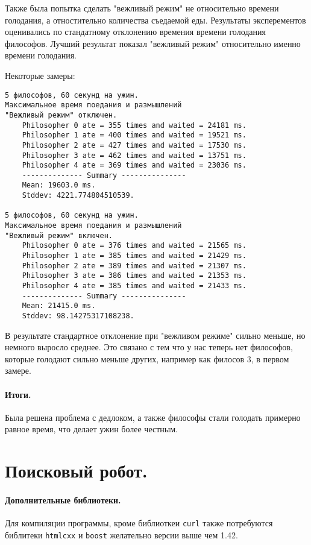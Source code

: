 \documentclass[12pt]{article}
\begin{document}
Также была попытка сделать "вежливый режим" не относительно времени голодания, а
отностительно количества съедаемой еды. Результаты эксперементов оценивались
по стандатному отклонению времения времени голодания философов.
Лучший результат показал "вежливый режим" относительно именно времени голодания.

Некоторые замеры:
\begin{verbatim}
5 философов, 60 секунд на ужин.
Максимальное время поедания и размышлений
"Вежливый режим" отключен.
    Philosopher 0 ate = 355 times and waited = 24181 ms.
    Philosopher 1 ate = 400 times and waited = 19521 ms.
    Philosopher 2 ate = 427 times and waited = 17530 ms.
    Philosopher 3 ate = 462 times and waited = 13751 ms.
    Philosopher 4 ate = 369 times and waited = 23036 ms.
    -------------- Summary ---------------
    Mean: 19603.0 ms.
    Stddev: 4221.774804510539.

5 философов, 60 секунд на ужин.
Максимальное время поедания и размышлений
"Вежливый режим" включен.
    Philosopher 0 ate = 376 times and waited = 21565 ms.
    Philosopher 1 ate = 385 times and waited = 21429 ms.
    Philosopher 2 ate = 389 times and waited = 21307 ms.
    Philosopher 3 ate = 386 times and waited = 21353 ms.
    Philosopher 4 ate = 385 times and waited = 21433 ms.
    -------------- Summary ---------------
    Mean: 21415.0 ms.
    Stddev: 98.14275317108238.
\end{verbatim}

В результате стандартное отклонение при "вежливом режиме" сильно
меньше, но немного выросло среднее. Это связано с тем
что у нас теперь нет философов, которые голодают сильно меньше
других, например как филосов 3, в первом замере.

\paragraph{Итоги.} Была решена проблема с дедлоком, а также философы стали
голодать примерно равное время, что делает ужин более честным.



\section{Поисковый робот.}
\paragraph{Дополнительные библиотеки.}
Для компиляции программы, кроме библиоткеи \verb|curl| также потребуются
библитеки \verb|htmlcxx| и \verb|boost| желательно версии выше чем 1.42.
\end{document}
